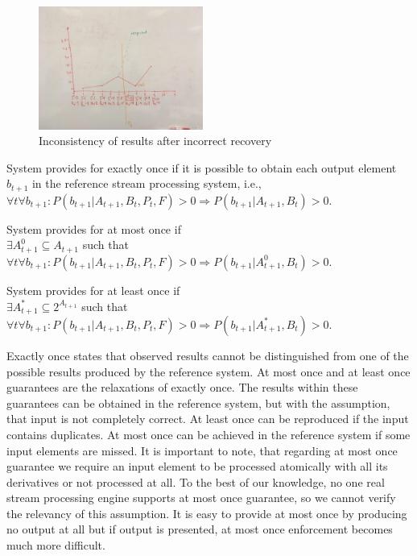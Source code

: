 \begin{figure}[htbp]
  \centering
  \includegraphics[width=0.48\textwidth]{pics/state-inconsistency}
  \caption{Inconsistency of results after incorrect recovery}
  \label {state-inconsistency}
\end{figure}

\begin{definition}{System provides for exactly once}
if it is possible to obtain each output element $b_{t+1}$ in the reference stream processing system, i.e.,\\ 
$\forall{t} \forall{b_{t+1}}: P(b_{t+1}|A_{t+1},B_t,P_t,F)>0 \Rightarrow P(b_{t+1}|A_{t+1},B_t)>0$.
\end{definition}

\begin{definition}{System provides for at most once}
if \\
$\exists{A^{0}_{t+1}\subseteq{A_{t+1}}}$ such that \\
$\forall{t} \forall{b_{t+1}}: P(b_{t+1}|A_{t+1},B_t,P_t,F)>0 \Rightarrow P(b_{t+1}|A^{0}_{t+1},B_t)>0$.
\end{definition}

\begin{definition}{System provides for at least once}
if \\
$\exists{A^{*}_{t+1}\subseteq{2^{A_{t+1}}}}$ such that \\
$\forall{t} \forall{b_{t+1}}: P(b_{t+1}|A_{t+1},B_t,P_t,F)>0 \Rightarrow P(b_{t+1}|A^{*}_{t+1},B_t)>0$.
\end{definition}

Exactly once states that observed results cannot be distinguished from one of the possible results produced by the reference system. At most once and at least once guarantees are the relaxations of exactly once. The results within these guarantees can be obtained in the reference system, but with the assumption, that input is not completely correct. At least once can be reproduced if the input contains duplicates. At most once can be achieved in the reference system if some input elements are missed. It is important to note, that regarding at most once guarantee we require an input element to be processed atomically with all its derivatives or not processed at all. To the best of our knowledge, no one real stream processing engine supports at most once guarantee, so we cannot verify the relevancy of this assumption. It is easy to provide at most once by producing no output at all but if output is presented, at most once enforcement becomes much more difficult.  

